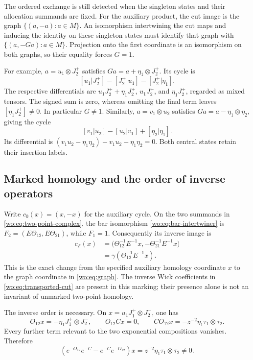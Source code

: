 The ordered exchange is still detected when the singleton states
and their allocation summands are fixed.  For the auxiliary product,
the cut image is the graph \(\{(a,-a):a\in M\}\).
An isomorphism intertwining the cut maps and inducing the identity
on these singleton states must identify that graph with
\(\{(a,-Ga):a\in M\}\).  Projection onto the first coordinate
is an isomorphism on both graphs, so their equality forces \(G=1\).

For example, \(a=u_1\otimes J_2^+\) satisfies
\(Ga=a+\eta_1\otimes J_2^+\).  Its cycle is
\begin{equation}\label{wo:eq:charge-cycle}
 [u_1|J_2^+]-[J_2^+|u_1]-[J_2^+|\eta_1].
\end{equation}
The respective differentials are
\(u_1J_2^++\eta_1J_2^+\), \(u_1J_2^+\), and
\(\eta_1J_2^+\), regarded as mixed tensors.  The signed sum is
zero, whereas omitting the final term leaves
\([\eta_1J_2^+]\ne0\).  In particular \(G\ne1\).
Similarly, \(a=v_1\otimes u_2\) satisfies
\(Ga=a-\eta_1\otimes\eta_2\), giving the cycle
\[
 [v_1|u_2]-[u_2|v_1]+[\eta_2|\eta_1].
\]
Its differential is
\((v_1u_2-\eta_1\eta_2)-v_1u_2+\eta_1\eta_2=0\).
Both central states retain their insertion labels.

\subsection{Marked homology and the order of inverse operators}

Write \(c_0(x)=(x,-x)\) for the auxiliary cycle.  On the two
summands in \eqref{wo:eq:two-point-complex}, the bar isomorphism
\eqref{wo:eq:bar-intertwiner} is
\(F_2=(E\Theta_{12},E\Theta_{21})\), while \(F_1=1\).
Consequently its inverse image is
\begin{equation}\label{wo:eq:marked-cycle}
 \begin{split}
 c_F(x)
 &=\bigl(\Theta_{12}^{-1}E^{-1}x,
             -\Theta_{21}^{-1}E^{-1}x\bigr)\\
 &=\gamma(\Theta_{12}^{-1}E^{-1}x).
 \end{split}
\end{equation}
This is the exact change from the specified auxiliary homology
coordinate \(x\) to the graph coordinate in
\eqref{wo:eq:graph}.  The inverse Wick coefficients in
\eqref{wo:eq:transported-cut} are present in this marking; their
presence alone is not an invariant of unmarked two-point homology.

The inverse order is necessary.  On
\(x=u_1J_1^+\otimes J_2^-\), one has
\[
 O_{12}x=-\eta_1J_1^+\otimes J_2^-,\qquad
 O_{12}Cx=0,\qquad
 CO_{12}x=-z^{-2}\eta_1\tau_1\otimes\tau_2.
\]
Every further term relevant to the two exponential compositions
vanishes.  Therefore
\begin{equation}\label{wo:eq:inverse-order}
 (e^{-O_{12}}e^{-C}-e^{-C}e^{-O_{12}})x
 =z^{-2}\eta_1\tau_1\otimes\tau_2\ne0.
\end{equation}

